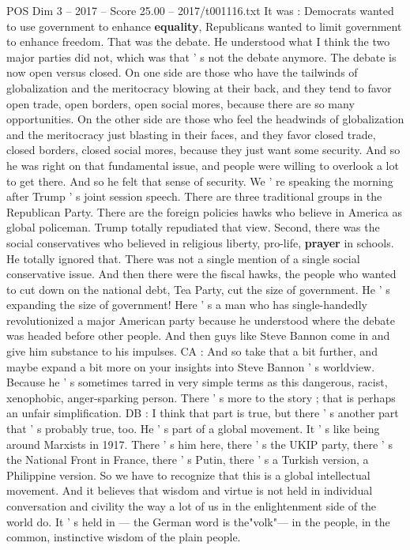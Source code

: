 \begin{textsample}{POS Dim 3 – 2017 – Score 25.00 – 2017/t001116.txt}
It was : Democrats wanted to use government to enhance \textbf{equality}, Republicans wanted to limit government to enhance freedom.
That was the debate.
He understood what I think the two major parties did not, which was that ' s not the debate anymore.
The debate is now open versus closed.
On one side are those who have the tailwinds of globalization and the meritocracy blowing at their back, and they tend to favor open trade, open borders, open social mores, because there are so many opportunities.
On the other side are those who feel the headwinds of globalization and the meritocracy just blasting in their faces, and they favor closed trade, closed borders, closed social mores, because they just want some security.
And so he was right on that fundamental issue, and people were willing to overlook a lot to get there.
And so he felt that sense of security.
We ' re speaking the morning after Trump ' s joint session speech.
There are three traditional groups in the Republican Party.
There are the foreign policies hawks who believe in America as global policeman.
Trump totally repudiated that view.
Second, there was the social conservatives who believed in religious liberty, pro-life, \textbf{prayer} in schools.
He totally ignored that.
There was not a single mention of a single social conservative issue.
And then there were the fiscal hawks, the people who wanted to cut down on the national debt, Tea Party, cut the size of government.
He ' s expanding the size of government!
Here ' s a man who has single-handedly revolutionized a major American party because he understood where the debate was headed before other people.
And then guys like Steve Bannon come in and give him substance to his impulses.
CA : And so take that a bit further, and maybe expand a bit more on your insights into Steve Bannon ' s worldview.
Because he ' s sometimes tarred in very simple terms as this dangerous, racist, xenophobic, anger-sparking person.
There ' s more to the story ; that is perhaps an unfair simplification.
DB : I think that part is true, but there ' s another part that ' s probably true, too.
He ' s part of a global movement.
It ' s like being around Marxists in 1917.
There ' s him here, there ' s the UKIP party, there ' s the National Front in France, there ' s Putin, there ' s a Turkish version, a Philippine version.
So we have to recognize that this is a global intellectual movement.
And it believes that wisdom and virtue is not held in individual conversation and civility the way a lot of us in the enlightenment side of the world do.
It ' s held in — the German word is the"volk"— in the people, in the common, instinctive wisdom of the plain people.

\end{textsample}
